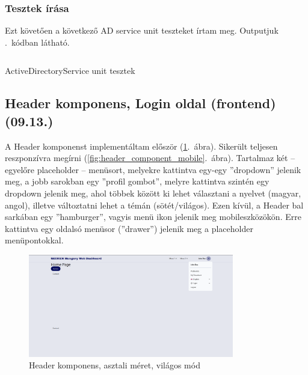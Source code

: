 \documentclass[a4paper]{article}
\begin{document}
\subsubsection*{Tesztek írása}

Ezt követően a következő AD service unit teszteket írtam meg. Outputjuk .~kódban látható.

\begin{listing}[!ht]
\inputminted[bgcolor=codebg, breaklines, breakanywhere, fontsize=\small]{text}{code/activeDirectoryServiceTests.txt}
\caption{ActiveDirectoryService unit tesztek}
\label{listing:active_directory_service_tests}
\end{listing}

\subsection{Header komponens, Login oldal (frontend) (09.13.)}

A Header komponenst implementáltam először (\ref{fig:header_component}.~ábra). Sikerült teljesen
reszponzívra megírni (\ref{fig:header_component_mobile}.~ábra). Tartalmaz
két – egyelőre placeholder – menüsort, melyekre kattintva egy-egy ”dropdown” jelenik meg, a jobb
sarokban egy ”profil gombot”, melyre kattintva szintén egy dropdown jelenik meg, ahol többek között
ki lehet választani a nyelvet (magyar, angol), illetve változtatni lehet a témán (sötét/világos). Ezen
kívül, a Header bal sarkában egy ”hamburger”, vagyis menü ikon jelenik meg mobileszközökön. Erre
kattintva egy oldalsó menüsor (”drawer”) jelenik meg a placeholder menüpontokkal.

\begin{figure}[ht]
  \centering
  \includegraphics[width = 0.8\textwidth]{images/header.png}
  \caption{Header komponens, asztali méret, világos mód}
  \label{fig:header_component}
\end{figure}
\begin{center}
\end{center}
\end{document}
